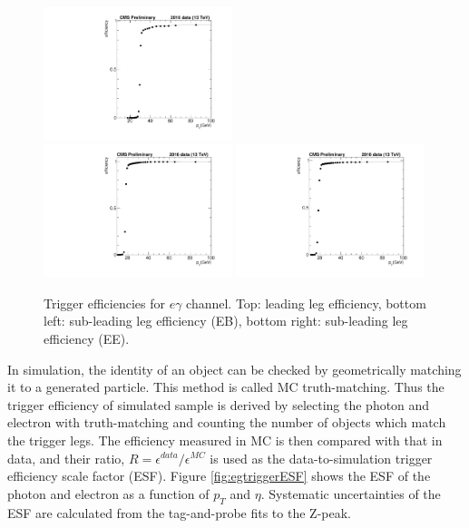 \documentclass[thesis.tex]{subfiles}
\renewcommand\_{\textunderscore\allowbreak}
\begin{document}
\begin{figure}[h]
  \centering
    \includegraphics[width=0.49\textwidth]{Figures/egTrigger_2016_leading.pdf}\\
    \includegraphics[width=0.49\textwidth]{Figures/egTrigger_2016_trailingEB.pdf}
    \includegraphics[width=0.49\textwidth]{Figures/egTrigger_2016_trailingEE.pdf}
  \caption{Trigger efficiencies for $e\gamma$ channel. Top: leading leg efficiency, bottom left: sub-leading leg efficiency (EB), bottom right: sub-leading leg efficiency (EE).}
  \label{fig:egtriggereff}
\end{figure}

In simulation, the identity of an object can be checked by geometrically matching it to a generated particle. 
This method is called MC truth-matching. 
Thus the trigger efficiency of simulated sample is derived by selecting the photon and electron with truth-matching and counting the number of objects which match the trigger legs. 
The efficiency measured in MC is then compared with that in data, and their ratio, $R = \epsilon^{data}/\epsilon^{MC}$ is used as the data-to-simulation trigger efficiency scale factor (ESF). 
Figure \ref{fig:egtriggerESF} shows the ESF of the photon and electron as a function of $p_{T}$ and $\eta$. 
Systematic uncertainties of the ESF are calculated from the tag-and-probe fits to the Z-peak. 
\end{document}
